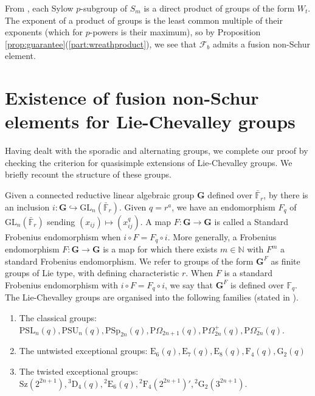 \documentclass{amsart}
\theoremstyle{plain}\newtheorem{theorem}{Theorem}[section]
\theoremstyle{plain}\newtheorem{conjecture}[theorem]{Conjecture}
\theoremstyle{plain}\newtheorem{corollary}[theorem]{Corollary}
\theoremstyle{plain}\newtheorem{lemma}[theorem]{Lemma}
\theoremstyle{plain}\newtheorem{proposition}[theorem]{Proposition}
\theoremstyle{plain}\newtheorem{statement}[theorem]{}
\theoremstyle{definition}\newtheorem{definition}[theorem]{Definition}
\theoremstyle{definition}\newtheorem{example}[theorem]{Example}
\theoremstyle{definition}\newtheorem{examples}[theorem]{Examples}
\theoremstyle{definition}\newtheorem{notation}[theorem]{Notation}
\theoremstyle{definition}\newtheorem{remark}[theorem]{Remark}
\theoremstyle{definition}\newtheorem{remarks}[theorem]{Remarks}
\theoremstyle{definition}\newtheorem{question}[theorem]{Question}
\theoremstyle{definition}\newtheorem{propositiondefinition}[theorem]{Definition/Proposition}
\begin{document}
From \cite[Proposition 7.9]{Sambale}, each Sylow $p$-subgroup of $S_{m}$ is a direct product of groups of the form $W_{t}$. The exponent of a product of groups is the least common multiple of their exponents (which for $p$-powers is their maximum), so by Proposition \ref{prop:guarantee}(\ref{part:wreathproduct}), we see that $\mathcal{F}_b$ admits a fusion non-Schur element.
\section{Existence of fusion non-Schur elements for Lie-Chevalley groups}
Having dealt with the sporadic and alternating groups, we complete our proof by checking the criterion for quasisimple extensions of Lie-Chevalley groups. We briefly recount the structure of these groups.

Given a connected reductive linear algebraic group $\mathbf{G}$ defined over $\bar{\mathbb{F}}_r$, by \cite[Theorem 1.7]{MalleTesterman} there is an inclusion $i:\mathbf{G} \hookrightarrow \mathrm{GL}_n(\bar{\mathbb{F}}_r)$. Given $q=r^a$, we have an endomorphism $F_q$ of $\mathrm{GL}_n(\bar{\mathbb{F}}_r)$ sending $(x_{ij}) \mapsto (x_{ij}^q)$. A map $F:\mathbf{G}\rightarrow \mathbf{G}$ is called a Standard Frobenius endomorphism when $i \circ F = F_q \circ i$. More generally, a Frobenius endomorphism $F: \mathbf{G} \rightarrow \mathbf{G}$ is a map for which there exists $m \in \mathbb{N}$ with $F^m$ a standard Frobenius endomorphism. We refer to groups of the form $\mathbf{G}^F$ as finite groups of Lie type, with defining characteristic $r$. When $F$ is a standard Frobenius endomorphism with $i \circ F = F_q \circ i$, we say that $\mathbf{G}^F$ is defined over $\mathbb{F}_q$. The Lie-Chevalley groups are organised into the following families (stated in \cite{Wilson}).
\begin{enumerate}
	\item The classical groups: $\mathrm{PSL}_n(q), \mathrm{PSU}_n(q), \mathrm{PSp}_{2n}(q), \mathrm{P}\Omega_{2n+1}(q), \mathrm{P}\Omega_{2n}^+(q), \mathrm{P}\Omega_{2n}^-(q)$.
	\item The untwisted exceptional groups: $\mathrm{E}_6(q), \mathrm{E}_7(q), \mathrm{E}_8(q), \mathrm{F}_4(q), \mathrm{G}_2(q)$
	\item The twisted exceptional groups: $\mathrm{Sz}(2^{2n+1}), \hspace{0pt}^3\mathrm{D}_4(q),\hspace{0pt}^2\mathrm{E}_6(q), \hspace{0pt}^2\mathrm{F}_4(2^{2n+1})',\hspace{0pt}^2\mathrm{G}_2(3^{2n+1})$. 

\end{enumerate}
\end{document}
